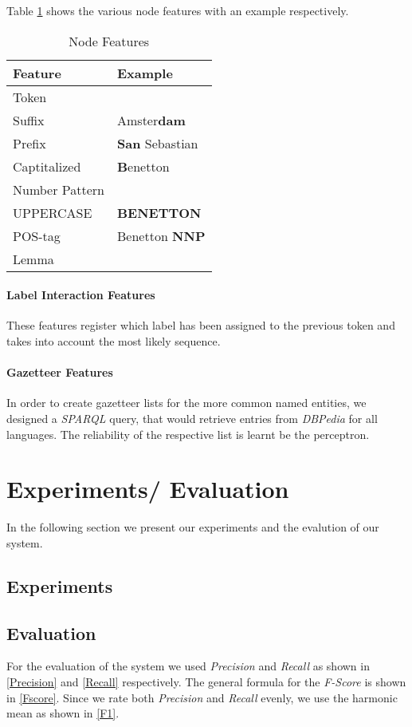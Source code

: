 \documentclass[11pt]{article}
\begin{document}
Table \ref{table:node} shows the various node features with an example respectively.

\begin{table}[h!]
\begin{tabular}{l|l}
\hline
\bf Feature & \bf Example \\
\hline
Token &  \\
Suffix& Amster\textbf{dam}\\
Prefix&  \textbf{San} Sebastian\\
Captitalized& \textbf{B}enetton\\
Number Pattern & \\
UPPERCASE &  \textbf{BENETTON}\\
POS-tag &  Benetton \textbf{NNP}   \\
Lemma &   \\
\end{tabular}
\caption{Node Features}
\label{table:node}
\end{table}

\paragraph*{Label Interaction Features}
These features register which label has been assigned to the previous token and takes into account the most likely sequence. 


\paragraph*{Gazetteer Features}
In order to create gazetteer lists for the more common named entities, we designed a \emph{SPARQL} query, that would retrieve entries from \emph{DBPedia} for all
languages. The reliability of the respective list is learnt be the perceptron. 


\section{Experiments/ Evaluation}
In the following section we present our experiments and the evalution of our system.
\subsection*{Experiments}


\subsection*{Evaluation}
For the evaluation of the system we used \emph{Precision} and \emph{Recall} as shown in \ref{Precision} and \ref{Recall} respectively.
The general formula for the \emph{F-Score} is shown in \ref{Fscore}. Since we rate both \emph{Precision} and \emph{Recall} evenly, we 
use the harmonic mean as shown in \ref{F1}.
\end{document}
